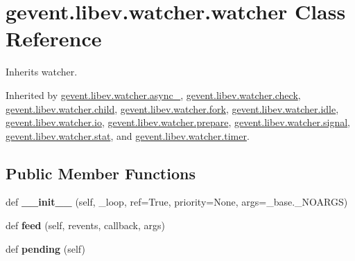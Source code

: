 \hypertarget{classgevent_1_1libev_1_1watcher_1_1watcher}{}\section{gevent.\+libev.\+watcher.\+watcher Class Reference}
\label{classgevent_1_1libev_1_1watcher_1_1watcher}


Inherits watcher.



Inherited by \hyperlink{classgevent_1_1libev_1_1watcher_1_1async__}{gevent.\+libev.\+watcher.\+async\+\_\+}, \hyperlink{classgevent_1_1libev_1_1watcher_1_1check}{gevent.\+libev.\+watcher.\+check}, \hyperlink{classgevent_1_1libev_1_1watcher_1_1child}{gevent.\+libev.\+watcher.\+child}, \hyperlink{classgevent_1_1libev_1_1watcher_1_1fork}{gevent.\+libev.\+watcher.\+fork}, \hyperlink{classgevent_1_1libev_1_1watcher_1_1idle}{gevent.\+libev.\+watcher.\+idle}, \hyperlink{classgevent_1_1libev_1_1watcher_1_1io}{gevent.\+libev.\+watcher.\+io}, \hyperlink{classgevent_1_1libev_1_1watcher_1_1prepare}{gevent.\+libev.\+watcher.\+prepare}, \hyperlink{classgevent_1_1libev_1_1watcher_1_1signal}{gevent.\+libev.\+watcher.\+signal}, \hyperlink{classgevent_1_1libev_1_1watcher_1_1stat}{gevent.\+libev.\+watcher.\+stat}, and \hyperlink{classgevent_1_1libev_1_1watcher_1_1timer}{gevent.\+libev.\+watcher.\+timer}.

\subsection*{Public Member Functions}
\begin{DoxyCompactItemize}
\item 
\mbox{\label{classgevent_1_1libev_1_1watcher_1_1watcher_a78b611ea9d8221bf14ad49d1655e9825}} 
def {\bfseries \+\_\+\+\_\+init\+\_\+\+\_\+} (self, \+\_\+loop, ref=True, priority=None, args=\+\_\+base.\+\_\+\+N\+O\+A\+R\+GS)
\item 
\mbox{\label{classgevent_1_1libev_1_1watcher_1_1watcher_a2b7dcba58f75deeb15b81a383c74e6b0}} 
def {\bfseries feed} (self, revents, callback, args)
\item 
\mbox{\label{classgevent_1_1libev_1_1watcher_1_1watcher_af44d611bff86ab3c7383ef6d24264317}} 
def {\bfseries pending} (self)
\end{DoxyCompactItemize}
